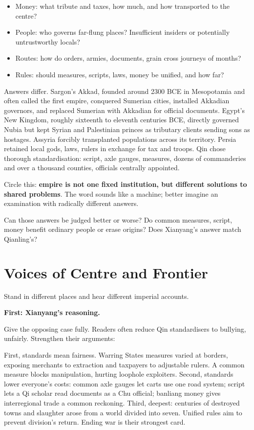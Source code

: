 \begin{itemize}
\item Money: what tribute and taxes, how much, and how transported to the centre?
\item People: who governs far-flung places? Insufficient insiders or potentially untrustworthy locals?
\item Routes: how do orders, armies, documents, grain cross journeys of months?
\item Rules: should measures, scripts, laws, money be unified, and how far?
\end{itemize}
Answers differ. Sargon's Akkad, founded around 2300 BCE in Mesopotamia and often called the first empire, conquered Sumerian cities, installed Akkadian governors, and replaced Sumerian with Akkadian for official documents. Egypt's New Kingdom, roughly sixteenth to eleventh centuries BCE, directly governed Nubia but kept Syrian and Palestinian princes as tributary clients sending sons as hostages. Assyria forcibly transplanted populations across its territory. Persia retained local gods, laws, rulers in exchange for tax and troops. Qin chose thorough standardisation: script, axle gauges, measures, dozens of commanderies and over a thousand counties, officials centrally appointed.

Circle this: \textbf{empire is not one fixed institution, but different solutions to shared problems}. The word sounds like a machine; better imagine an examination with radically different answers.

Can those answers be judged better or worse? Do common measures, script, money benefit ordinary people or erase origins? Does Xianyang's answer match Qianling's?

\section{Voices of Centre and Frontier}
Stand in different places and hear different imperial accounts.

\textbf{First: Xianyang's reasoning.}

Give the opposing case fully. Readers often reduce Qin standardisers to bullying, unfairly. Strengthen their arguments:

First, standards mean fairness. Warring States measures varied at borders, exposing merchants to extraction and taxpayers to adjustable rulers. A common measure blocks manipulation, hurting loophole exploiters. Second, standards lower everyone's costs: common axle gauges let carts use one road system; script lets a Qi scholar read documents as a Chu official; banliang money gives interregional trade a common reckoning. Third, deepest: centuries of destroyed towns and slaughter arose from a world divided into seven. Unified rules aim to prevent division's return. Ending war is their strongest card.

